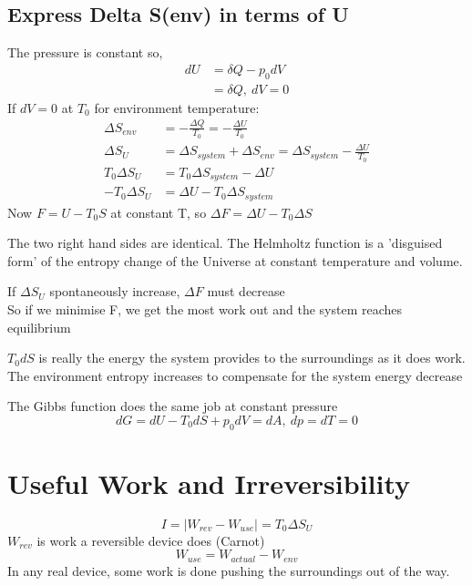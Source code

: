 \documentclass[a4paper, 11pt, normalem]{report}
\begin{document}
\subsection{Express Delta S(env) in terms of U}
The pressure is constant so,
\begin{align*}
    dU &= \delta Q - p_0 dV \\
    &= \delta Q,~ dV = 0
\end{align*}
If $dV = 0$ at $T_0$ for environment temperature:
\begin{align*}
    \Delta S_{env} &= -\frac{\Delta Q}{T_0} = -\frac{\Delta U}{T_0} \\
    \Delta S_{U} &= \Delta S_{system} + \Delta S_{env} = \Delta S_{system} - \frac{\Delta U}{T_0} \\
    T_0 \Delta S_U &= T_0\Delta S_{system} - \Delta U \\
    -T_0 \Delta S_U &= \Delta U - T_0\Delta S_{system}
\end{align*}
Now $F = U - T_0 S$ at constant T, so $\Delta F = \Delta U - T_0 \Delta S$

The two right hand sides are identical.
The Helmholtz function is a 'disguised form' of the entropy change of the Universe at constant temperature and volume.

If $\Delta S_U$ spontaneously increase, $\Delta F$ must decrease \\
So if we minimise F, we get the most work out and the system reaches equilibrium

$T_0 dS$ is really the energy the system provides to the surroundings as it does work.
The environment entropy increases to compensate for the system energy decrease

The Gibbs function does the same job at constant pressure
\begin{equation*}
    dG = dU - T_0 dS + p_0 dV = dA,~ dp = dT = 0
\end{equation*}

\section{Useful Work and Irreversibility}
\begin{equation*}
    I = |W_{rev} - W_{use}| = T_0 \Delta S_U
\end{equation*}
$W_{rev}$ is work a reversible device does (Carnot)
\begin{equation*}
    W_{use} = W_{actual} - W_{env}
\end{equation*}
In any real device, some work is done pushing the surroundings out of the way.
\end{document}
